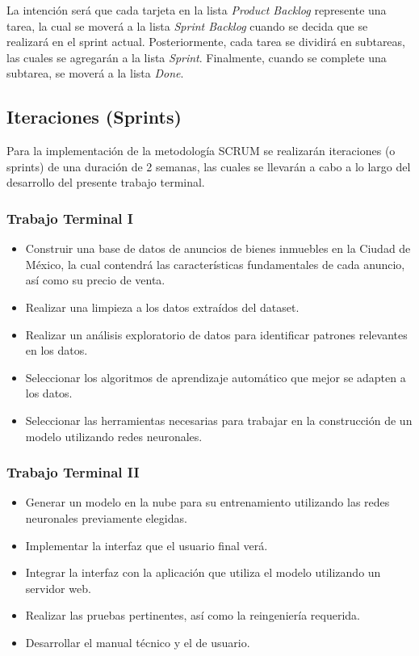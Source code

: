 La intención será que cada tarjeta en la lista \textit{Product Backlog} represente
una tarea, la cual se moverá a la lista \textit{Sprint Backlog} cuando se decida
que se realizará en el sprint actual. Posteriormente, cada tarea se dividirá en
subtareas, las cuales se agregarán a la lista \textit{Sprint}. Finalmente, cuando
se complete una subtarea, se moverá a la lista \textit{Done}.

\subsection{Iteraciones (Sprints)}

Para la implementación de la metodología SCRUM se realizarán iteraciones (o
sprints) de una duración de 2 semanas, las cuales se llevarán a cabo a lo largo
del desarrollo del presente trabajo terminal.

\subsubsection{Trabajo Terminal I}

\begin{itemize}
  \item Construir una base de datos de anuncios de bienes inmuebles en la Ciudad
  de México, la cual contendrá las características fundamentales de cada anuncio,
  así como su precio de venta.
  \item Realizar una limpieza a los datos extraídos del \gls{dataset}.
  \item Realizar un análisis exploratorio de datos para identificar patrones
  relevantes en los datos.
\item Seleccionar los algoritmos de aprendizaje automático que mejor se adapten
  a los datos.
  \item Seleccionar las herramientas necesarias para trabajar en
  la construcción de un modelo utilizando redes neuronales.
\end{itemize}

\subsubsection{Trabajo Terminal II}

\begin{itemize}
  \item Generar un modelo en la nube para su entrenamiento utilizando las redes
  neuronales previamente elegidas.
  \item Implementar la interfaz que el usuario final verá.
  \item Integrar la interfaz con la aplicación que utiliza el modelo utilizando
  un servidor web.
  \item Realizar las pruebas pertinentes, así como la reingeniería requerida.
  \item Desarrollar el manual técnico y el de usuario.
\end{itemize}

